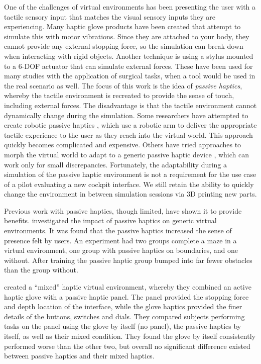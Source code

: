 One of the challenges of virtual environments has been presenting the user with a tactile sensory input that matches the visual sensory inputs they are experiencing.
Many haptic glove products have been created that attempt to simulate this with motor vibrations.
Since they are attached to your body, they cannot provide any external stopping force, so the simulation can break down when interacting with rigid objects.
Another technique is using a stylus mounted to a 6-DOF actuator that can simulate external forces.
These have been used for many studies with the application of surgical tasks, when a tool would be used in the real scenario as well.
The focus of this work is the idea of \emph{passive haptics}, whereby the tactile environment is recreated to provide the sense of touch, including external forces.
The disadvantage is that the tactile environment cannot dynamically change during the simulation.
Some researchers have attempted to create robotic passive haptics \citep{mcneely_robotic_1993, tachi_construction_1994}, which use a robotic arm to deliver the appropriate tactile experience to the user as they reach into the virtual world.
This approach quickly becomes complicated and expensive.
Others have tried approaches to morph the virtual world to adapt to a generic passive haptic device \citep{kohli_exploiting_2009,kohli_redirected_2012}, which can work only for small discrepancies.
Fortunately, the adaptability during a simulation of the passive haptic environment is not a requirement for the use case of a pilot evaluating a new cockpit interface.
We still retain the ability to quickly change the environment in between simulation sessions via 3D printing new parts.

Previous work with passive haptics, though limited, have shown it to provide benefits.
\citet{insko_passive_2001} investigated the impact of passive haptics on generic virtual environments.
It was found that the passive haptics increased the sense of presence felt by users.
An experiment had two groups complete a maze in a virtual environment, one group with passive haptics on boundaries, and one without.
After training the passive haptic group bumped into far fewer obstacles than the group without.

\citet{borst_evaluation_2005} created a ``mixed'' haptic virtual environment, whereby they combined an active haptic glove with a passive haptic panel.
The panel provided the stopping force and depth location of the interface, while the glove haptics provided the finer details of the buttons, switches and dials.
They compared subjects performing tasks on the panel using the glove by itself (no panel), the passive haptics by itself, as well as their mixed condition.
They found the glove by itself consistently performed worse than the other two, but overall no significant difference existed between passive haptics and their mixed haptics.

